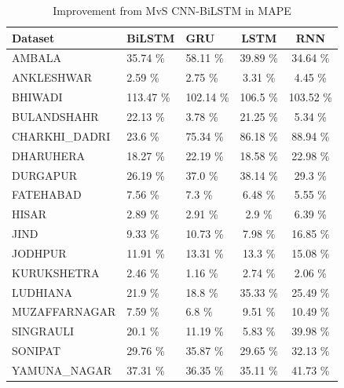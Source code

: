 \documentclass[a4paper,fleqn]{cas-sc}
\begin{document}
  \begin{table}[]
    \caption{Improvement from MvS CNN-BiLSTM in MAPE}
    \label{MAPE imp}
    \begin{tabular}{lllcc}
    \hline   Dataset       &   BiLSTM &   GRU &   LSTM &   RNN  \\ \hline
      AMBALA        &35.74           \% &58.11        \% &39.89         \% &34.64 \%       \\
      ANKLESHWAR      &2.59            \% &2.75         \% &3.31          \% &4.45 \%          \\
      BHIWADI        &113.47          \% &102.14       \% &106.5         \% &103.52 \%        \\
      BULANDSHAHR   &22.13           \% &3.78         \% &21.25         \% &5.34   \%        \\
      CHARKHI\_DADRI  &23.6            \% &75.34        \% &86.18         \% &88.94 \%         \\
      DHARUHERA      &18.27           \% &22.19        \% &18.58         \% &22.98 \%         \\
      DURGAPUR       &26.19           \% &37.0         \% &38.14         \% &29.3 \%          \\
      FATEHABAD       &7.56            \% &7.3          \% &6.48          \% &5.55 \%           \\
      HISAR           &2.89            \% &2.91         \% &2.9           \% &6.39 \%          \\
      JIND            &9.33            \% &10.73        \% &7.98          \% &16.85 \%         \\
      JODHPUR         &11.91           \% &13.31        \% &13.3          \% &15.08 \%          \\
      KURUKSHETRA     &2.46            \% &1.16         \% &2.74          \% &2.06 \%          \\
      LUDHIANA        &21.9            \% &18.8         \% &35.33         \% &25.49 \%         \\
      MUZAFFARNAGAR   &7.59            \% &6.8          \% &9.51          \% &10.49 \%          \\
      SINGRAULI      &20.1            \% &11.19        \% &5.83          \% &39.98 \%         \\
      SONIPAT        &29.76           \% &35.87        \% &29.65         \% &32.13 \%         \\
      YAMUNA\_NAGAR   &37.31           \% &36.35        \% &35.11         \% &41.73 \%         \\ \hline
    \end{tabular}
    \end{table}
\end{document}
